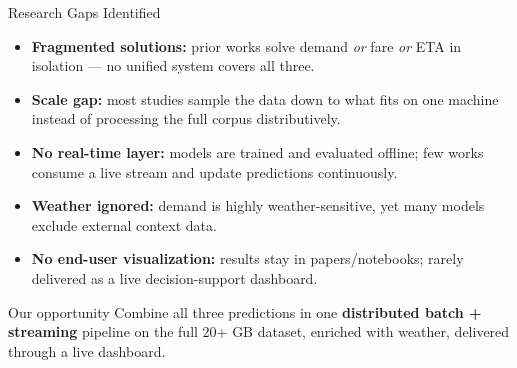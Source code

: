 \documentclass[aspectratio=169]{beamer}
\begin{document}
\begin{frame}{Research Gaps Identified}
  \begin{itemize}
    \item \textbf{Fragmented solutions:} prior works solve demand \emph{or} fare
          \emph{or} ETA in isolation --- no unified system covers all three.
    \item \textbf{Scale gap:} most studies sample the data down to what fits on
          one machine instead of processing the full corpus distributively.
    \item \textbf{No real-time layer:} models are trained and evaluated offline;
          few works consume a live stream and update predictions continuously.
    \item \textbf{Weather ignored:} demand is highly weather-sensitive, yet many
          models exclude external context data.
    \item \textbf{No end-user visualization:} results stay in papers/notebooks;
          rarely delivered as a live decision-support dashboard.
  \end{itemize}
  \vspace{4pt}
  \begin{alertblock}{Our opportunity}
    Combine all three predictions in one \textbf{distributed batch + streaming}
    pipeline on the full 20+ GB dataset, enriched with weather, delivered
    through a live dashboard.
  \end{alertblock}
\end{frame}
\end{document}
